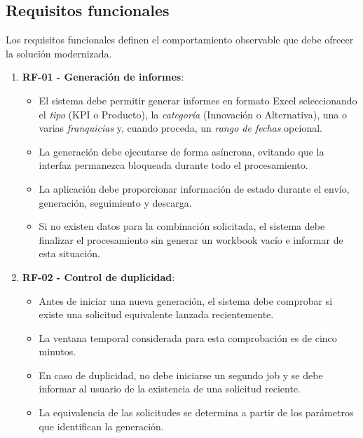 \documentclass[11pt,a4paper,titlepage,oneside]{report}
\begin{document}
\subsection{Requisitos funcionales}

Los requisitos funcionales definen el comportamiento observable que debe
ofrecer la solución modernizada.

\begin{enumerate}

    \item \textbf{RF-01 - Generación de informes}:
    \begin{itemize}
        \item El sistema debe permitir generar informes en formato Excel
        seleccionando el \textit{tipo} (KPI o Producto), la \textit{categoría}
        (Innovación o Alternativa), una o varias \textit{franquicias} y, cuando
        proceda, un \textit{rango de fechas} opcional.
        \item La generación debe ejecutarse de forma asíncrona, evitando que la
        interfaz permanezca bloqueada durante todo el procesamiento.
        \item La aplicación debe proporcionar información de estado durante el
        envío, generación, seguimiento y descarga.
        \item Si no existen datos para la combinación solicitada, el sistema
        debe finalizar el procesamiento sin generar un workbook vacío e
        informar de esta situación.
    \end{itemize}

    \item \textbf{RF-02 - Control de duplicidad}:
    \begin{itemize}
        \item Antes de iniciar una nueva generación, el sistema debe comprobar
        si existe una solicitud equivalente lanzada recientemente.
        \item La ventana temporal considerada para esta comprobación es de cinco
        minutos.
        \item En caso de duplicidad, no debe iniciarse un segundo job y se debe
        informar al usuario de la existencia de una solicitud reciente.
        \item La equivalencia de las solicitudes se determina a partir de los
        parámetros que identifican la generación.
    \end{itemize}


\end{enumerate}
\end{document}
